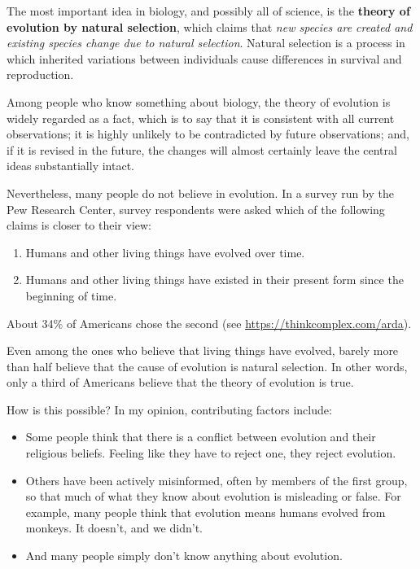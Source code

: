 \documentclass[12pt]{book}
\theoremstyle{exercise}
\begin{document}
The most important idea in biology, and possibly all of science, is the {\bf theory of evolution by natural selection}, which claims that {\em new species are created and existing species change due to natural selection}.  Natural selection is a process in which inherited variations between individuals cause differences in survival and reproduction.


Among people who know something about biology, the theory of evolution is widely regarded as a fact, which is to say that it is consistent with all current observations; it is highly unlikely to be contradicted by future observations; and, if it is revised in the future, the changes will almost certainly leave the central ideas substantially intact.


Nevertheless, many people do not believe in evolution.  In a survey run by the Pew Research Center, survey respondents were asked which of the following claims is closer to their view:

\begin{enumerate}

\item Humans and other living things have evolved over time.

\item Humans and other living things have existed in their present form since the beginning of time.

\end{enumerate}

About 34\% of Americans chose the second (see \url{https://thinkcomplex.com/arda}).

Even among the ones who believe that living things have evolved, barely more than half believe that the cause of evolution is natural selection.  In other words, only a third of Americans believe that the theory of evolution is true.

How is this possible?  In my opinion, contributing factors include:

\begin{itemize}

\item Some people think that there is a conflict between evolution and their religious beliefs.  Feeling like they have to reject one, they reject evolution.

\item Others have been actively misinformed, often by members of the first group, so that much of what they know about evolution is misleading or false.  For example, many people think that evolution means humans evolved from monkeys.  It doesn't, and we didn't.

\item And many people simply don't know anything about evolution.

\end{itemize}
\end{document}
